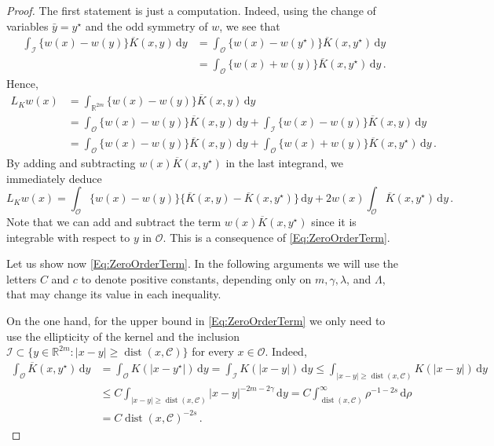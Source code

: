 \documentclass[12pt,reqno]{amsart}
\theoremstyle{definition}
\theoremstyle{remark}
\newcommand{\con}[1]{\mathbb{#1}}
\newcommand{\R}{\con{R}} %
\newcommand{\ccal}{\mathscr{C}}
\newcommand{\ical}{\mathcal{I}}
\newcommand{\ocal}{\mathcal{O}}
\newcommand{\s}{\gamma}
\renewcommand{\d}{\,\mathrm{d}} %
\DeclareMathOperator{\dist}{dist}
\numberwithin{equation}{section}
\begin{document}
\begin{proof}
	The first statement is just a computation. Indeed,  using the change of variables  $\bar{y} = y^\star$ and the odd symmetry of $w$, we see that
	\begin{align*}
	\int_{\ical}  \{w(x) - w(y) \} \overline{K}(x, y)\d y &= \int_{\ocal} \{w(x) - w(y^\star) \}\overline{K}(x, y^\star)\d y \\
	&= \int_{\ocal} \{w(x) + w(y) \}\overline{K}(x, y^\star)\d y\,.
	\end{align*}
	Hence,
	\begin{align*}
	L_K w (x) &= \int_{\R^{2m}}  \{w(x) - w(y) \} \overline{K}(x, y)\d y \\
	&= \int_{\ocal}  \{w(x) - w(y) \} \overline{K}(x, y)\d y +\int_{\ical}  \{w(x) - w(y) \} \overline{K}(x, y)\d y \\
	&= \int_{\ocal} \{w(x) - w(y) \} \overline{K}(x, y) \d y +  \int_{\ocal} \{w(x) + w(y) \} \overline{K}(x, y^\star) \d y \,.
	\end{align*}
	By adding and subtracting $w(x)\overline{K}(x, y^\star)$ in the last integrand, we immediately deduce
	$$
	L_K w (x) =  \int_{\ocal} \{w(x) - w(y) \} \{\overline{K}(x, y) - \overline{K}(x, y^\star)  \} \d y +  2 w(x) \int_{\ocal} \overline{K}(x, y^\star) \d y\,.
	$$
	Note that we can add and subtract the term $w(x)\overline{K}(x, y^\star)$  since it is integrable with respect to $y$ in $\ocal$. This is a consequence of \eqref{Eq:ZeroOrderTerm}.
	
	Let us show now \eqref{Eq:ZeroOrderTerm}. In the following arguments we will use the letters $C$ and $c$ to denote positive constants, depending only on $m, \s, \lambda$, and $\Lambda$, that may change its value in each inequality. 
	
	On the one hand, for the upper bound in \eqref{Eq:ZeroOrderTerm} we only need to use the ellipticity of the kernel and the inclusion $\ical \subset \{y\in\R^{2m}:|x-y|\geq \dist(x,\ccal)\}$ for every $x\in \ocal$. Indeed,
	\begin{align*}
	\int_{\ocal} \overline{K}(x, y^\star) \d y &=  \int_{\ocal} K(|x-y^\star|) \d y = \int_{\ical} K(|x-y|) \d y \leq \int_{|x-y|\geq \dist(x,\ccal)} K(|x-y|) \d y \\
	&\leq C \int_{|x-y|\geq \dist(x,\ccal)} |x-y|^{-2m-2\s} \d y = C \int_{\dist(x,\ccal)}^\infty \rho^{-1-2s} \d \rho \\
	&= C \dist(x,\ccal)^{-2s}\,.
	\end{align*}
	

\end{proof}
\end{document}
